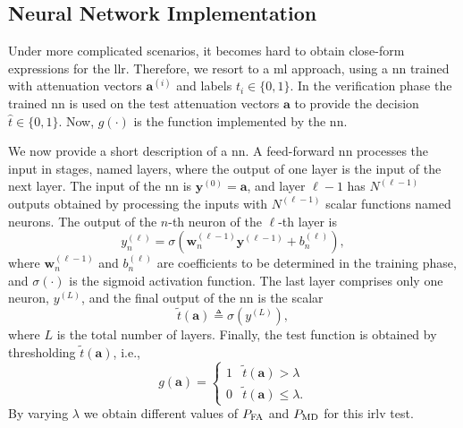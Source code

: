 \documentclass[conference,final]{IEEEtran}
\begin{document}

\subsection{Neural Network Implementation}\label{sec:nn}

Under more complicated scenarios, it becomes hard to obtain close-form expressions for the \ac{llr}. Therefore, we resort to a \ac{ml} approach, using a \ac{nn}  trained with attenuation vectors $\bm{a}^{(i)}$ and labels $t_i \in \{0,1\}$. In the verification phase the trained \ac{nn} is used on the test attenuation vectors $\bm a$ to provide the decision $\hat{t} \in \{0,1\}$. Now, $g(\cdot)$ is the function implemented by the \ac{nn}.

We now provide a short description of a \ac{nn}. A feed-forward \ac{nn} processes the input in stages, named layers, where the output of one layer is the input of the next layer. The input of the \ac{nn} is $\bm{y}^{(0)} = \bm{a}$, and layer $\ell-1$ has $N^{(\ell-1)}$ outputs obtained by processing the inputs with $N^{(\ell-1)}$ scalar functions named neurons. The output of the $n$-th neuron of the $\ell$-th layer is
\begin{equation}\label{eq:nonLin}
y_n^{(\ell)} = \sigma\left( \bm{w}_n^{(\ell -1)}\bm{y}^{(\ell-1)}+b_n^{(\ell)} \right),
\end{equation}
where $\bm{w}_n^{(\ell -1)}$ and $b_n^{(\ell)}$ are coefficients to be determined in the training phase, and $\sigma(\cdot)$ is the sigmoid activation function. 
The last layer comprises only one neuron, $y^{(L)}$, and the final output of the \ac{nn} is the scalar 
\begin{equation}
	\tilde{t}(\bm a) \triangleq \sigma(y^{(L)}),	
\end{equation}
where $L$ is the total number of layers. Finally, the test function is obtained by thresholding $\tilde{t}(\bm{a})$, i.e.,
\begin{equation}
\label{eq:decNN}
    g(\bm{a}) = \begin{cases}
    1 & \tilde{t}(\bm a) > \lambda \\
    0 & \tilde{t}(\bm a) \leq \lambda.
    \end{cases}
\end{equation}
By varying $\lambda$ we obtain different values of $P_{\rm FA}$ and $P_{\rm MD}$ for this \ac{irlv} test.
\end{document}

